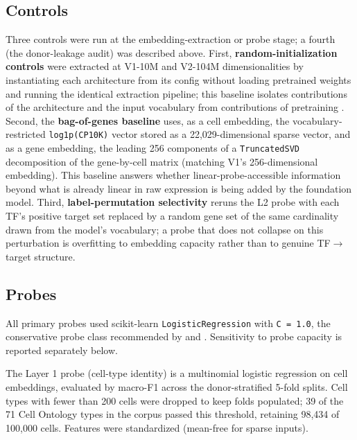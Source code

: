 \documentclass[
  11pt,
]{article}
\begin{document}
\subsection{Controls}\label{controls}

Three controls were run at the embedding-extraction or probe stage; a
fourth (the donor-leakage audit) was described above. First,
\textbf{random-initialization controls} were extracted at V1-10M and
V2-104M dimensionalities by instantiating each architecture from its
config without loading pretrained weights and running the identical
extraction pipeline; this baseline isolates contributions of the
architecture and the input vocabulary from contributions of pretraining
\citep{zhang2018random}. Second, the \textbf{bag-of-genes baseline}
uses, as a cell embedding, the vocabulary-restricted
\texttt{log1p(CP10K)} vector stored as a 22,029-dimensional sparse
vector, and as a gene embedding, the leading 256 components of a
\texttt{TruncatedSVD} decomposition of the gene-by-cell matrix (matching
V1's 256-dimensional embedding). This baseline answers whether
linear-probe-accessible information beyond what is already linear in raw
expression is being added by the foundation model. Third,
\textbf{label-permutation selectivity} \citep{hewitt2019} reruns
the L2 probe with each TF's positive target set replaced by a random
gene set of the same cardinality drawn from the model's vocabulary; a
probe that does not collapse on this perturbation is overfitting to
embedding capacity rather than to genuine TF$\to$target structure.

\subsection{Probes}\label{probes}

All primary probes used scikit-learn \texttt{LogisticRegression} with
\texttt{C\ =\ 1.0}, the conservative probe class recommended by
\citet{hewitt2019} and \citet{belinkov2022}. Sensitivity to probe capacity is
reported separately below.

The Layer 1 probe (cell-type identity) is a multinomial logistic
regression on cell embeddings, evaluated by macro-F1 across the
donor-stratified 5-fold splits. Cell types with fewer than 200 cells
were dropped to keep folds populated; 39 of the 71 Cell Ontology types
in the corpus passed this threshold, retaining 98,434 of 100,000 cells.
Features were standardized (mean-free for sparse inputs).
\end{document}
